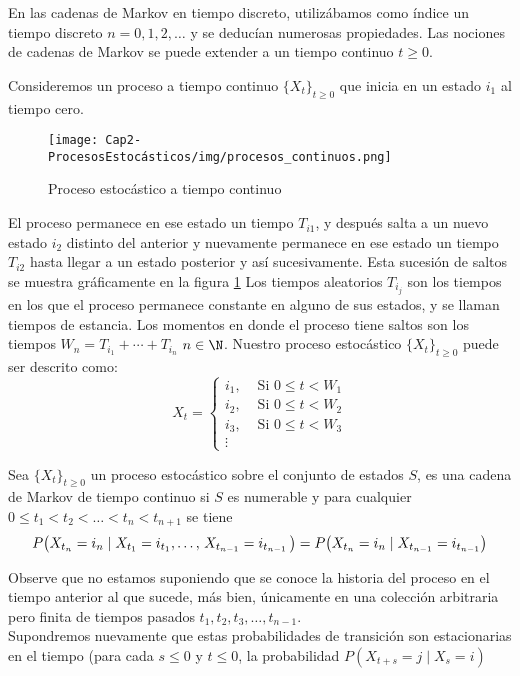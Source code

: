 \begin{Obs}
    En las cadenas de Markov en tiempo discreto, utilizábamos como índice un tiempo
    discreto $n=0, 1, 2,\ldots$ y se deducían numerosas propiedades.
    Las nociones de cadenas de Markov se puede extender a un tiempo continuo $t \geq 0$.
\end{Obs}
Consideremos un proceso a tiempo continuo $\{X_t\}_{t\geq 0}$ que inicia en un estado $i_1$  al tiempo cero.
\begin{figure}
    \centering
    \texttt{[image: Cap2-ProcesosEstocásticos/img/procesos\_continuos.png]}
    \caption{Proceso estocástico a tiempo continuo}
    \label{fig-procEstocastContinuo}
\end{figure}
El proceso permanece en ese estado un tiempo $T_{i 1}$, y
después salta a un nuevo estado $i_2$ distinto del anterior y nuevamente permanece en ese estado un tiempo $T_{i 2}$ hasta llegar a un estado posterior y así sucesivamente. Esta
sucesión de saltos se muestra gráficamente en la figura \ref{fig-procEstocastContinuo}
Los tiempos aleatorios $T_{i_j}$ son los tiempos
en los que el proceso permanece constante en alguno de sus estados, y se llaman tiempos de estancia.
Los momentos en donde el proceso tiene saltos son los tiempos $W_n=T_{i_1}+\cdots+T_{i_n}$ $n\in\N$.
Nuestro proceso estocástico $\{X_t\}_{t\geq 0}$ puede ser descrito como:
 $$X_t =
 \begin{cases}
    i_1, & \mbox{ Si $0\leq t <W_1$}\\
    i_2, & \mbox{ Si $0\leq t <W_2$}\\
    i_3, & \mbox{ Si $0\leq t <W_3$}\\
    \vdots
 \end{cases}$$
\begin{Def}
    Sea $\{X_t\}_{t\geq 0}$ un proceso estocástico sobre el conjunto de estados $S$, es una cadena de Markov de tiempo continuo si $S$ es numerable y para cualquier $0\leq t_1<t_2<\ldots<t_n<t_{n+1}$ se tiene  $$P\big(X_{t_n}=i_n\mid X_{t_1}=i_{t_1},\ldots ,\thinspace X_{t_{n-1}}=i_{t_{n-1}}\thinspace \big)=P\big(X_{t_n}=i_n\mid X_{t_{n-1}}=i_{t_{n-1}}\big)$$
\end{Def}
Observe que no estamos suponiendo que se conoce la historia del proceso en el tiempo anterior al que sucede, más bien, únicamente en una colección arbitraria pero finita de tiempos pasados $t_1,t_2,t_3,\ldots,t_{n-1}$.\\
Supondremos nuevamente que estas probabilidades de transición son estacionarias en el tiempo (para cada $s\leq 0$ y $t\leq 0$, la probabilidad $P(X_{t+s} =j \mid X_s= i)$ 
